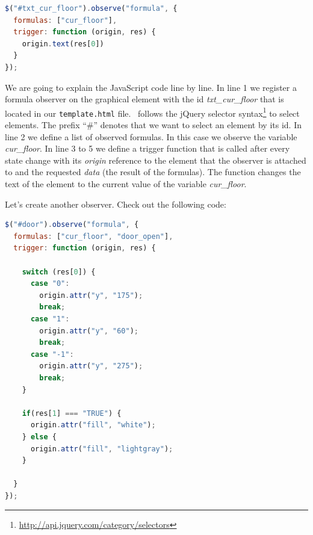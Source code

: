 \begin{lstlisting}[language=JavaScript, caption={Formula Observer Displaying the Current Floor (JavaScript)}]
$("#txt_cur_floor").observe("formula", {
  formulas: ["cur_floor"],
  trigger: function (origin, res) {
    origin.text(res[0])
  }
});
\end{lstlisting}

We are going to explain the JavaScript code line by line.
In line 1 we register a formula observer on the graphical element with the id \textit{txt\_cur\_floor} that is located in our \texttt{template.html} file.
\bms~follows the jQuery selector syntax\footnote{\url{http://api.jquery.com/category/selectors}} to select elements.
The prefix ``\#'' denotes that we want to select an element by its id.
In line 2 we define a list of observed formulas.
In this case we observe the variable \textit{cur\_floor}.
In line 3 to 5 we define a trigger function that is called after every state change with its \textit{origin} reference to the element that the observer is attached to and the requested \textit{data} (the result of the formulas).
The function changes the text of the element to the current value of the variable \textit{cur\_floor}.

Let's create another observer.
Check out the following code:

\begin{lstlisting}[language=JavaScript, caption={Formula Observer for the Lift Door (JavaScript)}]
$("#door").observe("formula", {
  formulas: ["cur_floor", "door_open"],
  trigger: function (origin, res) {
    
    switch (res[0]) {
      case "0":
        origin.attr("y", "175");
        break;
      case "1":
        origin.attr("y", "60");
        break;
      case "-1":
        origin.attr("y", "275");
        break;
    }
    
    if(res[1] === "TRUE") {
      origin.attr("fill", "white");
    } else {
      origin.attr("fill", "lightgray");
    }
    
  }
});
\end{lstlisting}

